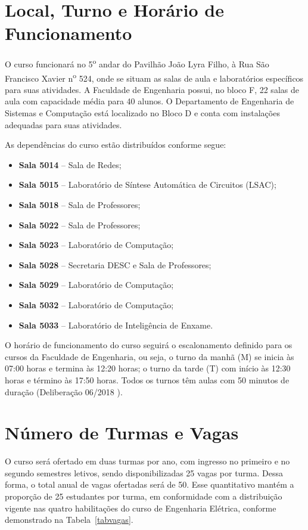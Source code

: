 \section{Local, Turno e Horário de Funcionamento}

O curso funcionará no 5\textsuperscript{o} andar do Pavilhão João Lyra Filho, à Rua São Francisco Xavier n\textsuperscript{o} 524, onde se situam as salas de aula e laboratórios específicos para suas atividades. A Faculdade de Engenharia possui, no bloco F, 22 salas de aula com capacidade média
para 40 alunos. O Departamento de Engenharia de Sistemas e Computação está localizado no Bloco D e conta com instalações adequadas para suas atividades.



As dependências do curso estão distribuídos conforme segue:
\begin{itemize}
  \item \textbf{Sala 5014} -- Sala de Redes;
  \item \textbf{Sala 5015} -- Laboratório de Síntese Automática de Circuitos (LSAC);
  \item \textbf{Sala 5018} -- Sala de Professores;
  \item \textbf{Sala 5022} -- Sala de Professores;
  \item \textbf{Sala 5023} -- Laboratório de Computação;
  \item \textbf{Sala 5028} -- Secretaria DESC e Sala de Professores;
  \item \textbf{Sala 5029} -- Laboratório de Computação;
  \item \textbf{Sala 5032} -- Laboratório de Computação;
  \item \textbf{Sala 5033} -- Laboratório de Inteligência de Enxame.
\end{itemize}


O horário de funcionamento do curso seguirá o escalonamento definido para os cursos da Faculdade de Engenharia, ou seja, o turno da manhã (M) se inicia às 07:00 horas e termina às 12:20 horas; o turno da tarde (T) com início às 12:30 horas e término às 17:50 horas. Todos os turnos têm aulas com 50 minutos de duração (Deliberação  06/2018 \cite{uerj2018}).

\section{Número de Turmas e Vagas}
O curso será ofertado em duas turmas por ano, com ingresso no primeiro e no segundo semestres letivos, sendo disponibilizadas 25 vagas por turma. Dessa forma, o total anual de vagas ofertadas será de 50. Esse quantitativo mantém a proporção de 25 estudantes por turma, em conformidade com a distribuição vigente nas quatro habilitações do curso de Engenharia Elétrica, conforme demonstrado na Tabela~\ref{tabvagas}.

